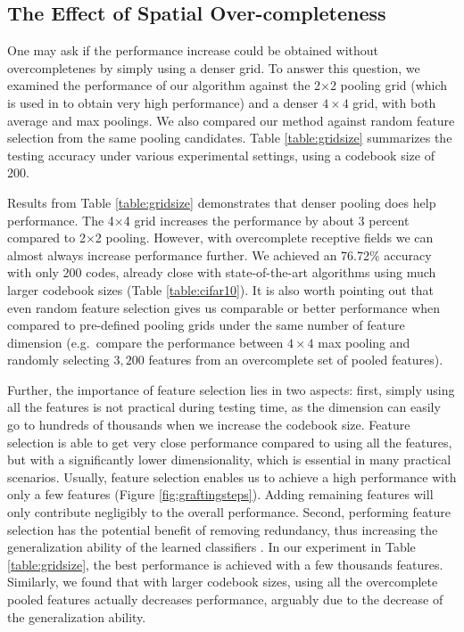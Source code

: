 \subsection{The Effect of Spatial Over-completeness}

One may ask if the performance increase could be obtained without overcompletenes by simply using a denser grid. To answer this question, we examined the performance of our algorithm against the 2$\times$2 pooling grid (which is used in \cite{Coates:2011ud} to obtain very high performance) and a denser $4\times4$ grid, with both average and max poolings. We also compared our method against random feature selection from the same pooling candidates. Table \ref{table:gridsize} summarizes the testing accuracy under various experimental settings, using a codebook size of 200.

Results from Table \ref{table:gridsize} demonstrates that denser pooling does help performance. The 4$\times$4 grid increases the performance by about 3 percent compared to 2$\times$2 pooling. However, with overcomplete receptive fields we can almost always increase performance further. We achieved an 76.72\% accuracy with only 200 codes, already close with state-of-the-art algorithms using much larger codebook sizes (Table \ref{table:cifar10}). It is also worth pointing out that even random feature selection gives us comparable or better performance when compared to pre-defined pooling grids under the same number of feature dimension (e.g.\ compare the performance between $4\times4$ max pooling and randomly selecting $3,200$ features from an overcomplete set of pooled features). 

Further, the importance of feature selection lies in two aspects: first, simply using all the features is not practical during testing time, as the dimension can easily go to hundreds of thousands when we increase the codebook size. Feature selection is able to get very close performance compared to using all the features, but with a significantly lower dimensionality, which is essential in many practical scenarios. Usually, feature selection enables us to achieve a high performance with only a few features (Figure \ref{fig:graftingsteps}). Adding remaining features will only contribute negligibly to the overall performance. Second, performing feature selection has the potential benefit of removing redundancy, thus increasing the generalization ability of the learned classifiers \cite{Perkins:2003vc,tibshirani1996regression}. In our experiment in Table \ref{table:gridsize}, the best performance is achieved with a few thousands features. Similarly, we found that with larger codebook sizes, using all the overcomplete pooled features actually decreases performance, arguably due to the decrease of the generalization ability. 

